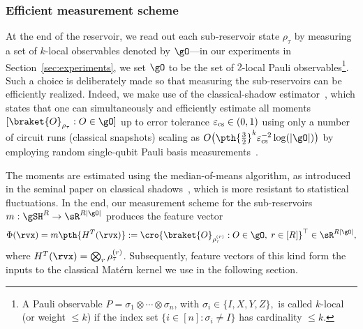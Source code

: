 \subsubsection{Efficient measurement scheme}\label{subsubsec:efficient-msmt-scheme}
At the end of the reservoir, we read out each sub-reservoir state $\rho_\tau$ by measuring a set of $k$-local observables denoted by $\gO$---in our experiments in Section~\ref{sec:experiments}, we set $\gO$ to be the set of $2$-local Pauli observables\footnote{A Pauli observable $P =\sigma_1 \otimes \cdots \otimes \sigma_n$, with $\sigma_i \in \{I, X, Y, Z\},$ is called $k$-local (or weight $\leq k$) if the index set $\{i \in [n]: \sigma_i \neq I\}$ has cardinality $\leq k$.}. Such a choice is deliberately made so that measuring the sub-reservoirs can be efficiently realized. Indeed, we make use of the classical-shadow estimator~\cite{huang-classical-shadows-2020}, which states that one can simultaneously and efficiently estimate all moments $[\braket{O}_{\rho_\tau}: O \in \gO]$ up to error tolerance $\varepsilon_{\rm cs} \in (0,1)$ using only a number of circuit runs (classical snapshots) scaling as $O\big(\pth{\tfrac{3}{2}}^k \varepsilon_{\rm cs}^{-2} \log(|\gO|)\big)$ by employing random single-qubit Pauli basis measurements~\cite{huang-classical-shadows-2020}.

The moments are estimated using the median-of-means algorithm, as introduced in the seminal paper on classical shadows~\cite{huang-classical-shadows-2020}, which is more resistant to statistical fluctuations. In the end, our measurement scheme for the sub-reservoirs $m: \gSH^R \to \sR^{R |\gO|}$ produces the feature vector
\begin{equation}\label{eq:feature-vector}
    \Phi(\rvx) = m \pth{H^T(\rvx)} := \cro{\braket{O}_{\rho_\tau^{(r)}}: O \in \gO, \;  r \in [R]}^\top \in \sR^{R |\gO|},
\end{equation}
where $H^T(\rvx) = \bigotimes_r \rho_\tau^{(r)}$.
Subsequently, feature vectors of this kind form the inputs to the classical Mat\'ern kernel we use in the following section.

